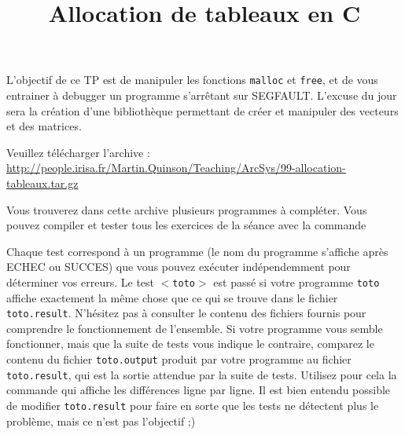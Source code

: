 \documentclass[10pt]{article}\usepackage[enonce]{exemptty}
\title{Allocation de tableaux en C}
\begin{document}
\maketitle

\noindent{}\medskip

L'objectif de ce TP est de manipuler les fonctions \lstinline$malloc$
et \lstinline$free$, et de vous entrainer à debugger un programme
s'arrêtant sur SEGFAULT. L'excuse du jour sera la création d'une
bibliothèque permettant de créer et manipuler des vecteurs et des
matrices.  \bigskip

Veuillez télécharger l'archive :\\
\url{http://people.irisa.fr/Martin.Quinson/Teaching/ArcSys/99-allocation-tableaux.tar.gz}

Vous trouverez dans cette archive plusieurs programmes à compléter. Vous pouvez
compiler et tester tous les exercices de la séance avec la commande 

Chaque test correspond à un programme (le nom du programme s'affiche
après ECHEC ou SUCCES) que vous pouvez exécuter indépendemment pour
déterminer vos erreurs. Le test \texttt{$<$toto$>$} est passé si votre
programme \texttt{toto} affiche exactement la même chose que ce qui se
trouve dans le fichier \texttt{toto.result}. N'hésitez pas à consulter
le contenu des fichiers fournis pour comprendre le fonctionnement de
l'ensemble. Si votre programme vous semble fonctionner, mais que la
suite de tests vous indique le contraire, comparez le contenu du
fichier \texttt{toto.output} produit par votre programme au fichier
\texttt{toto.result}, qui est la sortie attendue par la suite de
tests. Utilisez pour cela la commande  qui affiche les différences ligne par ligne. Il est
bien entendu possible de modifier \texttt{toto.result} pour faire en
sorte que les tests ne détectent plus le problème, mais ce n'est pas
l'objectif ;)
\end{document}
